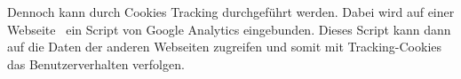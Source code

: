 Dennoch kann durch Cookies Tracking durchgeführt werden.
Dabei wird auf einer Webseite \zb\ ein Script von Google Analytics eingebunden. Dieses Script kann dann auf die Daten der anderen Webseiten zugreifen und somit mit Tracking-Cookies das Benutzer\-verhalten verfolgen.







\clearpage

\clearpage

